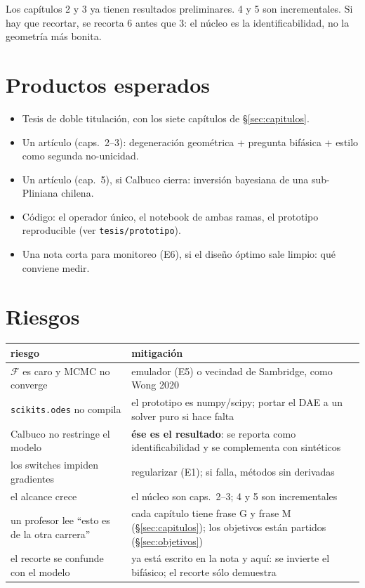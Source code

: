 \documentclass[11pt,a4paper]{article}
\theoremstyle{plain}
\theoremstyle{definition}
\theoremstyle{remark}
\newcommand{\F}{\mathcal{F}}
\begin{document}
Los capítulos 2 y 3 ya tienen resultados preliminares. 4 y 5 son
incrementales. Si hay que recortar, se recorta 6 antes que 3: el
núcleo es la identificabilidad, no la geometría más bonita.

\section{Productos esperados}

\begin{itemize}
\item Tesis de doble titulación, con los siete capítulos de
  \S\ref{sec:capitulos}.
\item Un artículo (caps.\ 2--3): degeneración geométrica +
  pregunta bifásica + estilo como segunda no-unicidad.
\item Un artículo (cap.\ 5), si Calbuco cierra: inversión
  bayesiana de una sub-Pliniana chilena.
\item Código: el operador único, el notebook de ambas ramas, el
  prototipo reproducible (ver \texttt{tesis/prototipo}).
\item Una nota corta para monitoreo (E6), si el diseño óptimo
  sale limpio: qué conviene medir.
\end{itemize}

\section{Riesgos}

\begin{center}
\small
\begin{tabular}{@{}p{}p{}@{}}
\toprule
riesgo & mitigación \\
\midrule
$\F$ es caro y MCMC no converge &
  emulador (E5) o vecindad de Sambridge, como Wong 2020 \\
\texttt{scikits.odes} no compila &
  el prototipo es numpy/scipy; portar el DAE a un solver
  puro si hace falta \\
Calbuco no restringe el modelo &
  \textbf{ése es el resultado}: se reporta como
  identificabilidad y se complementa con sintéticos \\
los switches impiden gradientes &
  regularizar (E1); si falla, métodos sin derivadas \\
el alcance crece &
  el núcleo son caps.\ 2--3; 4 y 5 son incrementales \\
un profesor lee ``esto es de la otra carrera'' &
  cada capítulo tiene frase G y frase M (\S\ref{sec:capitulos});
  los objetivos están partidos (\S\ref{sec:objetivos}) \\
el recorte se confunde con el modelo &
  ya está escrito en la nota y aquí: se invierte el bifásico;
  el recorte sólo demuestra \\
\bottomrule
\end{tabular}
\end{center}
\end{document}
